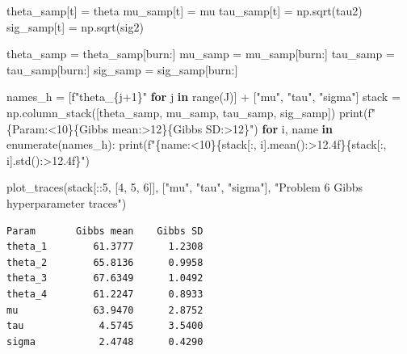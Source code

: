 \documentclass[
  letterpaper,
  DIV=11,
  numbers=noendperiod]{scrartcl}
\newenvironment{Shaded}{\begin{snugshade}}{\end{snugshade}}
\newcommand{\BuiltInTok}[1]{\textcolor[rgb]{0.00,0.23,0.31}{#1}}
\newcommand{\ControlFlowTok}[1]{\textcolor[rgb]{0.00,0.23,0.31}{\textbf{#1}}}
\newcommand{\DecValTok}[1]{\textcolor[rgb]{0.68,0.00,0.00}{#1}}
\newcommand{\KeywordTok}[1]{\textcolor[rgb]{0.00,0.23,0.31}{\textbf{#1}}}
\newcommand{\NormalTok}[1]{\textcolor[rgb]{0.00,0.23,0.31}{#1}}
\newcommand{\OperatorTok}[1]{\textcolor[rgb]{0.37,0.37,0.37}{#1}}
\newcommand{\SpecialCharTok}[1]{\textcolor[rgb]{0.37,0.37,0.37}{#1}}
\newcommand{\SpecialStringTok}[1]{\textcolor[rgb]{0.13,0.47,0.30}{#1}}
\newcommand{\StringTok}[1]{\textcolor[rgb]{0.13,0.47,0.30}{#1}}
\begin{document}
\begin{Shaded}
\begin{Highlighting}[]
\NormalTok{    theta\_samp[t] }\OperatorTok{=}\NormalTok{ theta}
\NormalTok{    mu\_samp[t]    }\OperatorTok{=}\NormalTok{ mu}
\NormalTok{    tau\_samp[t]   }\OperatorTok{=}\NormalTok{ np.sqrt(tau2)}
\NormalTok{    sig\_samp[t]   }\OperatorTok{=}\NormalTok{ np.sqrt(sig2)}

\NormalTok{theta\_samp }\OperatorTok{=}\NormalTok{ theta\_samp[burn:]}
\NormalTok{mu\_samp    }\OperatorTok{=}\NormalTok{ mu\_samp[burn:]}
\NormalTok{tau\_samp   }\OperatorTok{=}\NormalTok{ tau\_samp[burn:]}
\NormalTok{sig\_samp   }\OperatorTok{=}\NormalTok{ sig\_samp[burn:]}

\NormalTok{names\_h }\OperatorTok{=}\NormalTok{ [}\SpecialStringTok{f"theta\_}\SpecialCharTok{\{}\NormalTok{j}\OperatorTok{+}\DecValTok{1}\SpecialCharTok{\}}\SpecialStringTok{"} \ControlFlowTok{for}\NormalTok{ j }\KeywordTok{in} \BuiltInTok{range}\NormalTok{(J)] }\OperatorTok{+}\NormalTok{ [}\StringTok{"mu"}\NormalTok{, }\StringTok{"tau"}\NormalTok{, }\StringTok{"sigma"}\NormalTok{]}
\NormalTok{stack }\OperatorTok{=}\NormalTok{ np.column\_stack([theta\_samp, mu\_samp, tau\_samp, sig\_samp])}
\BuiltInTok{print}\NormalTok{(}\SpecialStringTok{f"}\SpecialCharTok{\{}\StringTok{\textquotesingle{}Param\textquotesingle{}}\SpecialCharTok{:\textless{}10\}\{}\StringTok{\textquotesingle{}Gibbs mean\textquotesingle{}}\SpecialCharTok{:\textgreater{}12\}\{}\StringTok{\textquotesingle{}Gibbs SD\textquotesingle{}}\SpecialCharTok{:\textgreater{}12\}}\SpecialStringTok{"}\NormalTok{)}
\ControlFlowTok{for}\NormalTok{ i, name }\KeywordTok{in} \BuiltInTok{enumerate}\NormalTok{(names\_h):}
    \BuiltInTok{print}\NormalTok{(}\SpecialStringTok{f"}\SpecialCharTok{\{}\NormalTok{name}\SpecialCharTok{:\textless{}10\}\{}\NormalTok{stack[:, i]}\SpecialCharTok{.}\NormalTok{mean()}\SpecialCharTok{:\textgreater{}12.4f\}\{}\NormalTok{stack[:, i]}\SpecialCharTok{.}\NormalTok{std()}\SpecialCharTok{:\textgreater{}12.4f\}}\SpecialStringTok{"}\NormalTok{)}

\NormalTok{plot\_traces(stack[::}\DecValTok{5}\NormalTok{, [}\DecValTok{4}\NormalTok{, }\DecValTok{5}\NormalTok{, }\DecValTok{6}\NormalTok{]], [}\StringTok{"mu"}\NormalTok{, }\StringTok{"tau"}\NormalTok{, }\StringTok{"sigma"}\NormalTok{],}
            \StringTok{"Problem 6 Gibbs hyperparameter traces"}\NormalTok{)}
\end{Highlighting}
\end{Shaded}

\begin{verbatim}
Param       Gibbs mean    Gibbs SD
theta_1        61.3777      1.2308
theta_2        65.8136      0.9958
theta_3        67.6349      1.0492
theta_4        61.2247      0.8933
mu             63.9470      2.8752
tau             4.5745      3.5400
sigma           2.4748      0.4290
\end{verbatim}
\end{document}
